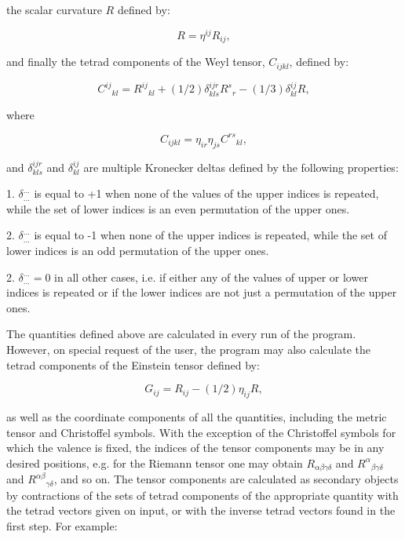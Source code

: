 \noindent the scalar curvature $R$ defined by:


\begin{equation}
R = \eta^{ij} R_{ij} ,
\end{equation}

\noindent and finally the tetrad components of the Weyl tensor, $C_{ijkl}$,
defined by:

\begin{equation}
{C^{ij}}_{kl} = {R^{ij}}_{kl} + (1/2) \delta^{ijr}_{kls}{R^s}_r - (1/3)
\delta^{ij}_{kl} R ,
\end{equation}

\noindent where

\begin{equation}
C_{ijkl} = \eta_{ir} \eta_{js} {C^{rs}}_{kl} ,
\end{equation}

\noindent and $\delta^{ijr}_{kls}$ and $\delta^{ij}_{kl}$ are multiple
Kronecker deltas defined by the following properties:

1. $\delta^{...}_{...}$ is equal to +1 when none of the values of the upper
indices  is  repeated,
     while the set of lower indices is an even permutation of the
     upper ones.

2. $\delta^{...}_{...}$ is equal to -1 when none of the upper indices is
repeated, while the set of
     lower indices is an odd permutation of the upper ones.

2. $\delta^{...}_{...} = 0$ in all other cases, i.e. if either  any  of  the
values  of
     upper  or  lower indices is repeated or if the lower indices
     are not just a permutation of the upper ones.


The quantities defined above are  calculated  in  every
     run of the program. However, on special request of the user,
the program may also calculate the tetrad components of  the
     Einstein tensor defined by:

\begin{equation}
G_{ij} = R_{ij} - (1/2) \eta_{ij} R ,
\end{equation}

\noindent as well as the coordinate components of all the  quantities,
     including  the  metric  tensor and Christoffel symbols. With
the exception of the Christoffel symbols for which  the  valence  is fixed, the
indices of the tensor components may be
     in any desired positions, e.g. for the  Riemann  tensor  one
may obtain $R_{\alpha \beta \gamma \delta}$ and ${R^{\alpha}}_{\beta \gamma
\delta}$ and ${R^{\alpha \beta}}_{\gamma \delta}$,  and  so on. The tensor
components are calculated  as  secondary  objects  by contractions  of the sets
of tetrad components of the appropriate quantity with the tetrad vectors given
on  input,  or
     with the inverse tetrad vectors found in the first step. For
     example:

